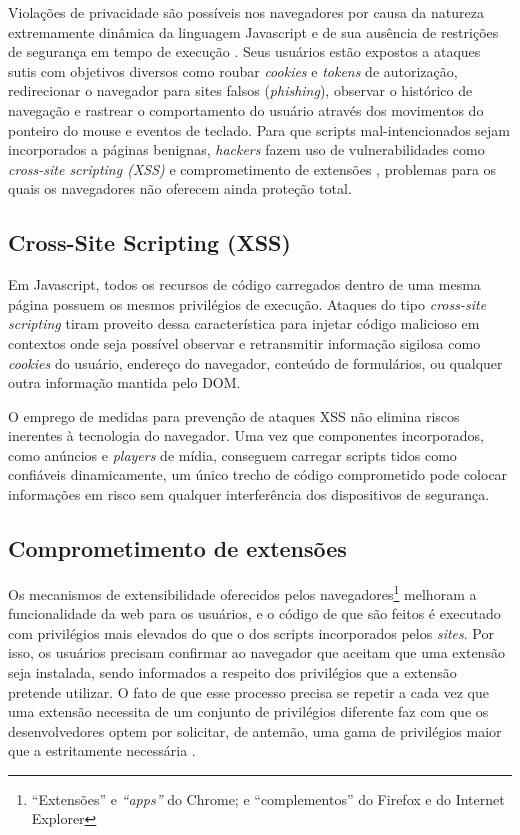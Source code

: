 Violações de privacidade são possíveis nos navegadores por causa da natureza extremamente dinâmica da linguagem Javascript e de sua ausência de restrições de segurança em tempo de execução \cite{Jang2010}. Seus usuários estão expostos a ataques sutis com objetivos diversos como roubar \textit{cookies} e \textit{tokens} de autorização, redirecionar o navegador para sites falsos (\textit{phishing}), observar o histórico de navegação e rastrear o comportamento do usuário através dos movimentos do ponteiro do mouse e eventos de teclado. Para que scripts mal-intencionados sejam incorporados a páginas benignas, \textit{hackers} fazem uso de vulnerabilidades como \textit{cross-site scripting (XSS)} \cite{OWASP:XSS} e comprometimento de extensões \cite{Heule2015}, problemas para os quais os navegadores não oferecem ainda proteção total.

\subsection{Cross-Site Scripting (XSS)}
Em Javascript, todos os recursos de código carregados dentro de uma mesma página possuem os mesmos privilégios de execução. Ataques do tipo \textit{cross-site scripting} tiram proveito dessa característica para injetar código malicioso em contextos onde seja possível observar e retransmitir informação sigilosa como \textit{cookies} do usuário, endereço do navegador, conteúdo de formulários, ou qualquer outra informação mantida pelo DOM.

O emprego de medidas para prevenção de ataques XSS \cite{OWASP:XSS-CheatSheet} não elimina riscos inerentes à tecnologia do navegador. Uma vez que componentes incorporados, como anúncios e \textit{players} de mídia, conseguem carregar scripts tidos como confiáveis dinamicamente, um único trecho de código comprometido pode colocar informações em risco sem qualquer interferência dos dispositivos de segurança.

\subsection{Comprometimento de extensões}

Os mecanismos de extensibilidade oferecidos pelos navegadores\footnote{``Extensões'' e \textit{``apps''} do Chrome; e ``complementos'' do Firefox e do Internet Explorer} melhoram a funcionalidade da web para os usuários, e o código de que são feitos é executado com privilégios mais elevados do que o dos scripts incorporados pelos \textit{sites}. Por isso, os usuários precisam confirmar ao navegador que aceitam que uma extensão seja instalada, sendo informados a respeito dos privilégios que a extensão pretende utilizar. O fato de que esse processo precisa se repetir a cada vez que uma extensão necessita de um conjunto de privilégios diferente faz com que os desenvolvedores optem por solicitar, de antemão, uma gama de privilégios maior que a estritamente necessária \cite{Heule2015}.

